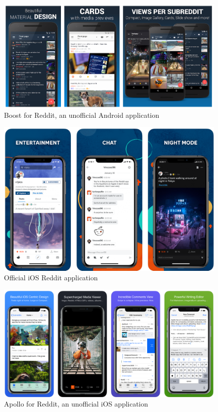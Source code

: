     \begin{figure}[ht]
        \centering
             \includegraphics[width=\textwidth]{figures/reddit/reddit_boost.png}
        \caption{Boost for Reddit, an unofficial Android application}
        \label{a:fig:reddit_boost}
    \end{figure}
    
    \begin{figure}[ht]
        \centering
             \includegraphics[width=\textwidth]{figures/reddit/reddit_ios.png}
        \caption{Official iOS Reddit application}
        \label{a:fig:reddit_ios}
    \end{figure}
    
    \begin{figure}[ht]
        \centering
             \includegraphics[width=\textwidth]{figures/reddit/reddit_apollo.png}
        \caption{Apollo for Reddit, an unofficial iOS application}
        \label{a:fig:reddit_apollo}
    \end{figure}

